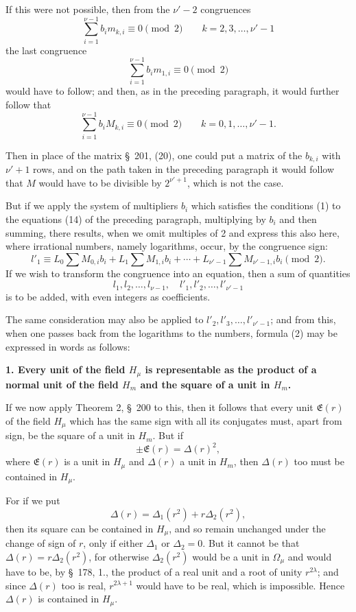\documentclass[11pt]{article}
\begin{document}
If this were not possible, then from the $\nu'-2$ congruences
\[
\sum_{i=1}^{\nu-1}b_i m_{k,i}\equiv0\pmod2\qquad k=2,3,\ldots,\nu'-1
\]
the last congruence
\[
\sum_{i=1}^{\nu-1}b_i m_{1,i}\equiv0\pmod2
\]
would have to follow; and then, as in the preceding paragraph, it would further follow that
\[
\sum_{i=1}^{\nu-1}b_i M_{k,i}\equiv0\pmod2\qquad k=0,1,\ldots,\nu'-1.
\]

Then in place of the matrix \S~201, (20), one could put a matrix of the $b_{k,i}$ with $\nu'+1$ rows, and on the path taken in the preceding paragraph it would follow that $M$ would have to be divisible by $2^{\nu'+1}$, which is not the case.

But if we apply the system of multipliers $b_i$ which satisfies the conditions (1) to the equations (14) of the preceding paragraph, multiplying by $b_i$ and then summing, there results, when we omit multiples of 2 and express this also here, where irrational numbers, namely logarithms, occur, by the congruence sign:
\begin{equation}
l'_1\equiv L_0\sum M_{0,i}b_i+L_1\sum M_{1,i}b_i+\cdots+L_{\nu'-1}\sum M_{\nu'-1,i}b_i\pmod2.
\tag{2}
\end{equation}
If we wish to transform the congruence into an equation, then a sum of quantities
\[
l_1,l_2,\ldots,l_{\nu-1},\quad l'_1,l'_2,\ldots,l'_{\nu'-1}
\]
is to be added, with even integers as coefficients.

The same consideration may also be applied to $l'_2,l'_3,\ldots,l'_{\nu'-1}$; and from this, when one passes back from the logarithms to the numbers, formula (2) may be expressed in words as follows:

\begin{center}\textbf{1. Every unit of the field $H_\mu$ is representable as the product of a normal unit of the field $H_m$ and the square of a unit in $H_m$.}\end{center}

If we now apply Theorem 2, \S~200 to this, then it follows that every unit $\mathfrak E(r)$ of the field $H_\mu$ which has the same sign with all its conjugates must, apart from sign, be the square of a unit in $H_m$. But if
\[
\pm\mathfrak E(r)=\Delta(r)^2,
\]
where $\mathfrak E(r)$ is a unit in $H_\mu$ and $\Delta(r)$ a unit in $H_m$, then $\Delta(r)$ too must be contained in $H_\mu$.

For if we put
\[
\Delta(r)=\Delta_1(r^2)+r\Delta_2(r^2),
\]
then its square can be contained in $H_\mu$, and so remain unchanged under the change of sign of $r$, only if either $\Delta_1$ or $\Delta_2=0$. But it cannot be that $\Delta(r)=r\Delta_2(r^2)$, for otherwise $\Delta_2(r^2)$ would be a unit in $\Omega_\mu$ and would have to be,
by \S~178, 1., the product of a real unit and a root of unity $r^{2\lambda}$; and since $\Delta(r)$ too is real, $r^{2\lambda+1}$ would have to be real, which is impossible. Hence $\Delta(r)$ is contained in $H_\mu$.
\end{document}
